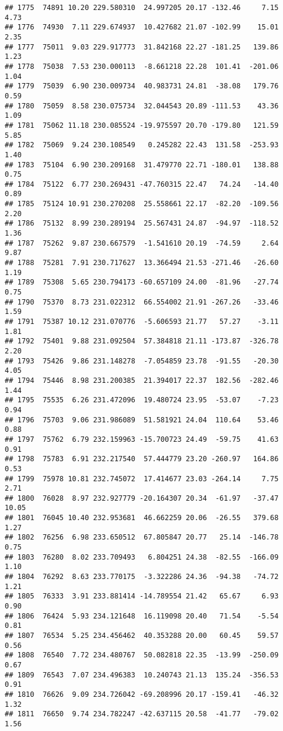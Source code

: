 \documentclass[]{article}
\begin{document}
\begin{verbatim}
## 1775  74891 10.20 229.580310  24.997205 20.17 -132.46     7.15  4.73
## 1776  74930  7.11 229.674937  10.427682 21.07 -102.99    15.01  2.35
## 1777  75011  9.03 229.917773  31.842168 22.27 -181.25   139.86  1.23
## 1778  75038  7.53 230.000113  -8.661218 22.28  101.41  -201.06  1.04
## 1779  75039  6.90 230.009734  40.983731 24.81  -38.08   179.76  0.59
## 1780  75059  8.58 230.075734  32.044543 20.89 -111.53    43.36  1.09
## 1781  75062 11.18 230.085524 -19.975597 20.70 -179.80   121.59  5.85
## 1782  75069  9.24 230.108549   0.245282 22.43  131.58  -253.93  1.40
## 1783  75104  6.90 230.209168  31.479770 22.71 -180.01   138.88  0.75
## 1784  75122  6.77 230.269431 -47.760315 22.47   74.24   -14.40  0.89
## 1785  75124 10.91 230.270208  25.558661 22.17  -82.20  -109.56  2.20
## 1786  75132  8.99 230.289194  25.567431 24.87  -94.97  -118.52  1.36
## 1787  75262  9.87 230.667579  -1.541610 20.19  -74.59     2.64  9.87
## 1788  75281  7.91 230.717627  13.366494 21.53 -271.46   -26.60  1.19
## 1789  75308  5.65 230.794173 -60.657109 24.00  -81.96   -27.74  0.75
## 1790  75370  8.73 231.022312  66.554002 21.91 -267.26   -33.46  1.59
## 1791  75387 10.12 231.070776  -5.606593 21.77   57.27    -3.11  1.81
## 1792  75401  9.88 231.092504  57.384818 21.11 -173.87  -326.78  2.20
## 1793  75426  9.86 231.148278  -7.054859 23.78  -91.55   -20.30  4.05
## 1794  75446  8.98 231.200385  21.394017 22.37  182.56  -282.46  1.44
## 1795  75535  6.26 231.472096  19.480724 23.95  -53.07    -7.23  0.94
## 1796  75703  9.06 231.986089  51.581921 24.04  110.64    53.46  0.88
## 1797  75762  6.79 232.159963 -15.700723 24.49  -59.75    41.63  0.91
## 1798  75783  6.91 232.217540  57.444779 23.20 -260.97   164.86  0.53
## 1799  75978 10.81 232.745072  17.414677 23.03 -264.14     7.75  2.71
## 1800  76028  8.97 232.927779 -20.164307 20.34  -61.97   -37.47 10.05
## 1801  76045 10.40 232.953681  46.662259 20.06  -26.55   379.68  1.27
## 1802  76256  6.98 233.650512  67.805847 20.77   25.14  -146.78  0.75
## 1803  76280  8.02 233.709493   6.804251 24.38  -82.55  -166.09  1.10
## 1804  76292  8.63 233.770175  -3.322286 24.36  -94.38   -74.72  1.21
## 1805  76333  3.91 233.881414 -14.789554 21.42   65.67     6.93  0.90
## 1806  76424  5.93 234.121648  16.119098 20.40   71.54    -5.54  0.81
## 1807  76534  5.25 234.456462  40.353288 20.00   60.45    59.57  0.56
## 1808  76540  7.72 234.480767  50.082818 22.35  -13.99  -250.09  0.67
## 1809  76543  7.07 234.496383  10.240743 21.13  135.24  -356.53  0.91
## 1810  76626  9.09 234.726042 -69.208996 20.17 -159.41   -46.32  1.32
## 1811  76650  9.74 234.782247 -42.637115 20.58  -41.77   -79.02  1.56

\end{verbatim}
\end{document}
